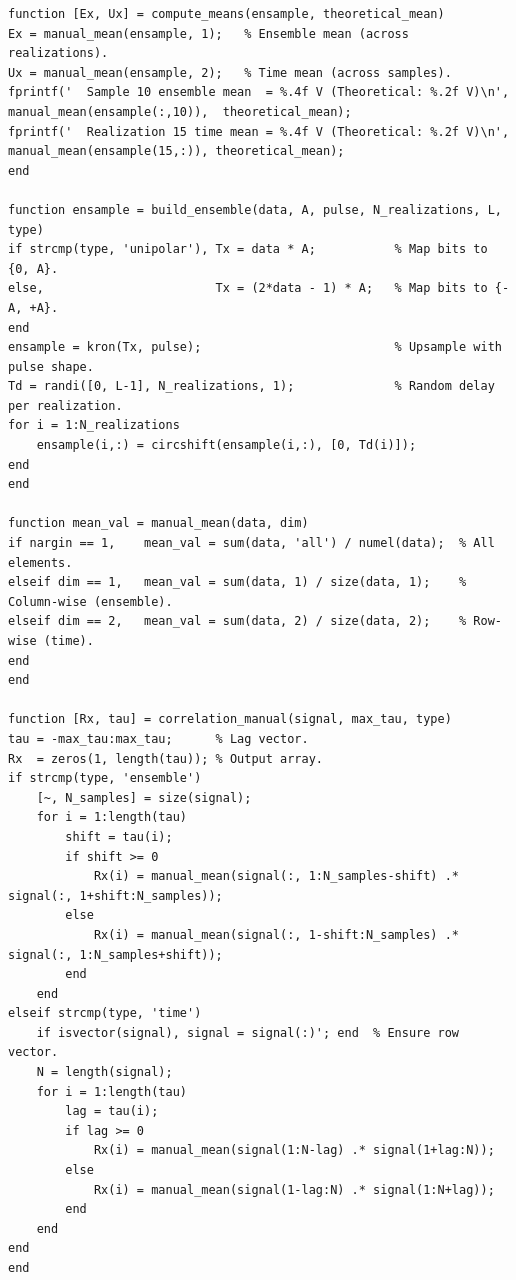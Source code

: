 \begin{longlisting}
\begin{verbatim}
function [Ex, Ux] = compute_means(ensample, theoretical_mean)
Ex = manual_mean(ensample, 1);   % Ensemble mean (across realizations).
Ux = manual_mean(ensample, 2);   % Time mean (across samples).
fprintf('  Sample 10 ensemble mean  = %.4f V (Theoretical: %.2f V)\n', manual_mean(ensample(:,10)),  theoretical_mean);
fprintf('  Realization 15 time mean = %.4f V (Theoretical: %.2f V)\n', manual_mean(ensample(15,:)), theoretical_mean);
end

function ensample = build_ensemble(data, A, pulse, N_realizations, L, type)
if strcmp(type, 'unipolar'), Tx = data * A;           % Map bits to {0, A}.
else,                        Tx = (2*data - 1) * A;   % Map bits to {-A, +A}.
end
ensample = kron(Tx, pulse);                           % Upsample with pulse shape.
Td = randi([0, L-1], N_realizations, 1);              % Random delay per realization.
for i = 1:N_realizations
    ensample(i,:) = circshift(ensample(i,:), [0, Td(i)]);
end
end

function mean_val = manual_mean(data, dim)
if nargin == 1,    mean_val = sum(data, 'all') / numel(data);  % All elements.
elseif dim == 1,   mean_val = sum(data, 1) / size(data, 1);    % Column-wise (ensemble).
elseif dim == 2,   mean_val = sum(data, 2) / size(data, 2);    % Row-wise (time).
end
end

function [Rx, tau] = correlation_manual(signal, max_tau, type)
tau = -max_tau:max_tau;      % Lag vector.
Rx  = zeros(1, length(tau)); % Output array.
if strcmp(type, 'ensemble')
    [~, N_samples] = size(signal);
    for i = 1:length(tau)
        shift = tau(i);
        if shift >= 0
            Rx(i) = manual_mean(signal(:, 1:N_samples-shift) .* signal(:, 1+shift:N_samples));
        else
            Rx(i) = manual_mean(signal(:, 1-shift:N_samples) .* signal(:, 1:N_samples+shift));
        end
    end
elseif strcmp(type, 'time')
    if isvector(signal), signal = signal(:)'; end  % Ensure row vector.
    N = length(signal);
    for i = 1:length(tau)
        lag = tau(i);
        if lag >= 0
            Rx(i) = manual_mean(signal(1:N-lag) .* signal(1+lag:N));
        else
            Rx(i) = manual_mean(signal(1-lag:N) .* signal(1:N+lag));
        end
    end
end
end
    
\end{verbatim}
\end{longlisting}